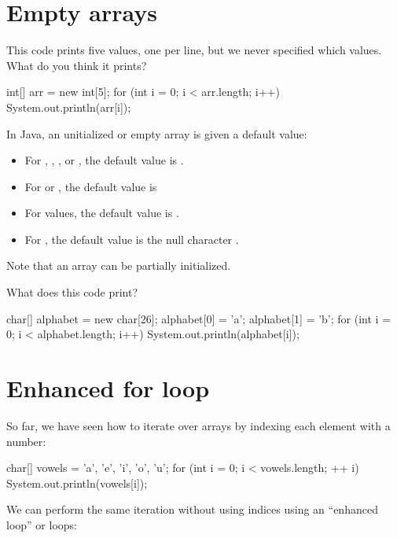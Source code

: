 \section{Empty arrays}

This code prints five values, one per line, but we never specified which values. What do you think it prints?

\begin{code}
int[] arr = new int[5];
for (int i = 0; i < arr.length; i++) {
    System.out.println(arr[i]);
}
\end{code}

In Java, an unitialized or empty array is given a default value:

\begin{itemize}
\item For , , , or , the default value is .
\item For  or , the default value is 
\item For  values, the default value is .
\item For , the default value is the null character .
\end{itemize}

Note that an array can be partially initialized.

\begin{example}
What does this code print?

\begin{code}
char[] alphabet = new char[26];
alphabet[0] = 'a';
alphabet[1] = 'b';
for (int i = 0; i < alphabet.length; i++) {
    System.out.println(alphabet[i]);
}
\end{code}
\end{example}

\section{Enhanced for loop}

So far, we have seen how to iterate over arrays by indexing each element with a number:

\begin{code}
char[] vowels = {'a', 'e', 'i', 'o', 'u'};
for (int i = 0; i < vowels.length; ++ i) {
    System.out.println(vowels[i]);
}
\end{code}

We can perform the same iteration without using indices using an ``enhanced  loop'' or  loops:

